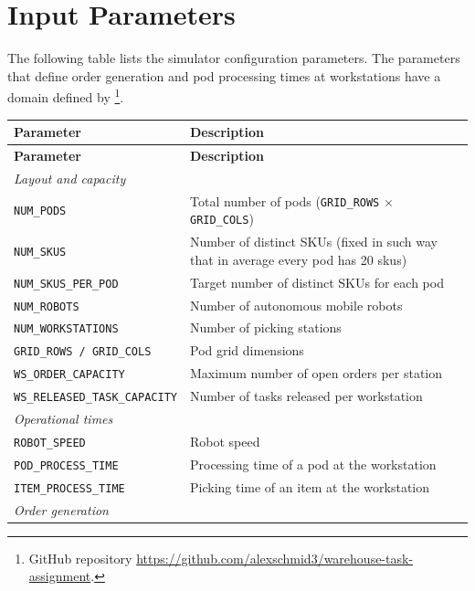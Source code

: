 \documentclass[a4paper,10pt]{article}
\begin{document}
\newpage
\section{Input Parameters}

The following table lists the simulator configuration parameters.
The parameters that define order generation and pod processing times at workstations have a domain defined by \cite{Barnhart2024}\footnote{GitHub repository \url{https://github.com/alexschmid3/warehouse-task-assignment}.}.

\begin{table}[htbp]
\begin{longtable}{p{5cm} p{7.5cm}}
\toprule
\textbf{Parameter} & \textbf{Description} \\
\midrule
\endfirsthead
\toprule
\textbf{Parameter} & \textbf{Description} \\
\midrule
\endhead
\multicolumn{2}{l}{\textit{Layout and capacity}} \\[2pt]
\texttt{NUM\_PODS}                   & Total number of pods (\texttt{GRID\_ROWS} $\times$ \texttt{GRID\_COLS}) \\
\texttt{NUM\_SKUS}                   & Number of distinct SKUs (fixed in such way that in average every pod has 20 skus) \\
\texttt{NUM\_SKUS\_PER\_POD}         & Target number of distinct SKUs for each pod \\
\texttt{NUM\_ROBOTS}                 & Number of autonomous mobile robots \\
\texttt{NUM\_WORKSTATIONS}           & Number of picking stations \\
\texttt{GRID\_ROWS / GRID\_COLS}     & Pod grid dimensions \\
\texttt{WS\_ORDER\_CAPACITY}         & Maximum number of open orders per station \\
\texttt{WS\_RELEASED\_TASK\_CAPACITY}& Number of tasks released per workstation \\[6pt]
\multicolumn{2}{l}{\textit{Operational times}} \\[2pt]
\texttt{ROBOT\_SPEED}                & Robot speed \\
\texttt{POD\_PROCESS\_TIME}          & Processing time of a pod at the workstation \\
\texttt{ITEM\_PROCESS\_TIME}         & Picking time of an item at the workstation \\[6pt]
\multicolumn{2}{l}{\textit{Order generation}} \\[2pt]

\end{longtable}
\end{table}
\end{document}

